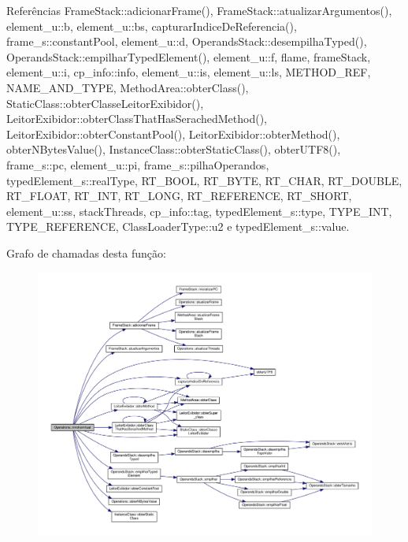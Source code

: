 Referências Frame\+Stack\+::adicionar\+Frame(), Frame\+Stack\+::atualizar\+Argumentos(), element\+\_\+u\+::b, element\+\_\+u\+::bs, capturar\+Indice\+De\+Referencia(), frame\+\_\+s\+::constant\+Pool, element\+\_\+u\+::d, Operands\+Stack\+::desempilha\+Typed(), Operands\+Stack\+::empilhar\+Typed\+Element(), element\+\_\+u\+::f, flame, frame\+Stack, element\+\_\+u\+::i, cp\+\_\+info\+::info, element\+\_\+u\+::is, element\+\_\+u\+::ls, M\+E\+T\+H\+O\+D\+\_\+\+R\+EF, N\+A\+M\+E\+\_\+\+A\+N\+D\+\_\+\+T\+Y\+PE, Method\+Area\+::obter\+Class(), Static\+Class\+::obter\+Classe\+Leitor\+Exibidor(), Leitor\+Exibidor\+::obter\+Class\+That\+Has\+Serached\+Method(), Leitor\+Exibidor\+::obter\+Constant\+Pool(), Leitor\+Exibidor\+::obter\+Method(), obter\+N\+Bytes\+Value(), Instance\+Class\+::obter\+Static\+Class(), obter\+U\+T\+F8(), frame\+\_\+s\+::pc, element\+\_\+u\+::pi, frame\+\_\+s\+::pilha\+Operandos, typed\+Element\+\_\+s\+::real\+Type, R\+T\+\_\+\+B\+O\+OL, R\+T\+\_\+\+B\+Y\+TE, R\+T\+\_\+\+C\+H\+AR, R\+T\+\_\+\+D\+O\+U\+B\+LE, R\+T\+\_\+\+F\+L\+O\+AT, R\+T\+\_\+\+I\+NT, R\+T\+\_\+\+L\+O\+NG, R\+T\+\_\+\+R\+E\+F\+E\+R\+E\+N\+CE, R\+T\+\_\+\+S\+H\+O\+RT, element\+\_\+u\+::ss, stack\+Threads, cp\+\_\+info\+::tag, typed\+Element\+\_\+s\+::type, T\+Y\+P\+E\+\_\+\+I\+NT, T\+Y\+P\+E\+\_\+\+R\+E\+F\+E\+R\+E\+N\+CE, Class\+Loader\+Type\+::u2 e typed\+Element\+\_\+s\+::value.

Grafo de chamadas desta função\+:
\nopagebreak
\begin{figure}[H]
\begin{center}
\leavevmode
\includegraphics[width=350pt]{classOperations_acf53d7e184b8828702b4d5036ef0a7a9_cgraph}
\end{center}
\end{figure}
\mbox{\label{classOperations_aaa890c310bc7a93e97b2c5004df94e70}} 
